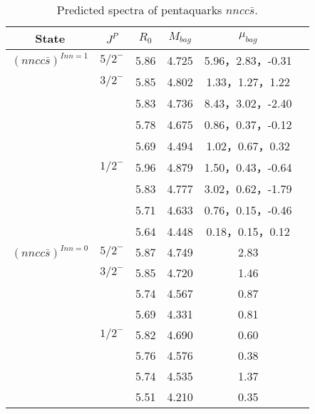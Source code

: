 \documentclass[prd,twocolumn,floatfix,nofootinbib]{revtex4}
\begin{document}
\begin{table*}[!htbp]
    \caption{Predicted spectra of pentaquarks $nncc\bar{s}$.}
    \begin{tabular}{cccccc}
        \hline\hline
        {\rm State} &$J^{P}$ &$R_{0}$ &$M_{bag}$ &$\mu_{bag}$  \\ \hline
        ${(nncc\bar{s})}^{I{nn}=1}$
            &${5/2}^{-}$     &5.86   &4.725 &5.96，2.83，-0.31  \\                
            &${3/2}^{-}$     &5.85   &4.802 &1.33，1.27，1.22 \\
                         &$ $     &5.83   &4.736 &8.43，3.02，-2.40  \\
                         &$ $     &5.78   &4.675 &0.86，0.37，-0.12  \\
                         &$ $     &5.69   &4.494 &1.02，0.67，0.32 \\
            &${1/2}^{-}$     &5.96   &4.879 &1.50，0.43，-0.64  \\
                         &$ $     &5.83   &4.777 &3.02，0.62，-1.79  \\
                         &$ $     &5.71   &4.633 &0.76，0.15，-0.46  \\
                         &$ $     &5.64   &4.448 &0.18，0.15，0.12 \\
            ${(nncc\bar{s})}^{I{nn}=0}$
            &${5/2}^{-}$     &5.87   &4.749 &2.83  \\                
            &${3/2}^{-}$     &5.85   &4.720 &1.46 \\
                         &$ $     &5.74   &4.567 &0.87 \\
                         &$ $     &5.69   &4.331 &0.81  \\
            &${1/2}^{-}$     &5.82   &4.690 &0.60  \\
                         &$ $     &5.76   &4.576 &0.38  \\
                         &$ $     &5.74   &4.535 &1.37  \\
                         &$ $     &5.51   &4.210 &0.35 \\
       \hline\hline
    \end{tabular}
\end{table*}
\end{document}
